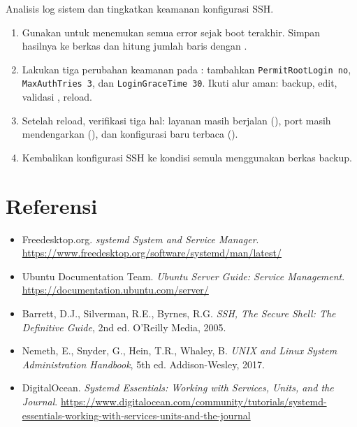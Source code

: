 \begin{exercisebox}
Analisis log sistem dan tingkatkan keamanan konfigurasi SSH.
\begin{enumerate}
    \item Gunakan  untuk menemukan semua error sejak boot terakhir. Simpan hasilnya ke berkas dan hitung jumlah baris dengan .
    \item Lakukan tiga perubahan keamanan pada : tambahkan \texttt{PermitRootLogin no}, \texttt{MaxAuthTries 3}, dan \texttt{LoginGraceTime 30}. Ikuti alur aman: backup, edit, validasi , reload.
    \item Setelah reload, verifikasi tiga hal: layanan masih berjalan (), port masih mendengarkan (), dan konfigurasi baru terbaca ().
    \item Kembalikan konfigurasi SSH ke kondisi semula menggunakan berkas backup.
\end{enumerate}
\end{exercisebox}

\section{Referensi}
\label{sec:service-references}

\begin{itemize}
    \item Freedesktop.org. \textit{systemd System and Service Manager}. \url{https://www.freedesktop.org/software/systemd/man/latest/}
    \item Ubuntu Documentation Team. \textit{Ubuntu Server Guide: Service Management}. \url{https://documentation.ubuntu.com/server/}
    \item Barrett, D.J., Silverman, R.E., Byrnes, R.G. \textit{SSH, The Secure Shell: The Definitive Guide}, 2nd ed. O'Reilly Media, 2005.
    \item Nemeth, E., Snyder, G., Hein, T.R., Whaley, B. \textit{UNIX and Linux System Administration Handbook}, 5th ed. Addison-Wesley, 2017.
    \item DigitalOcean. \textit{Systemd Essentials: Working with Services, Units, and the Journal}. \url{https://www.digitalocean.com/community/tutorials/systemd-essentials-working-with-services-units-and-the-journal}
\end{itemize}
